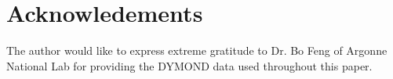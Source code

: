 \section*{Acknowledements}
\label{acknow}
The author would like to express extreme gratitude to Dr. Bo Feng of
Argonne National Lab for providing the DYMOND data used throughout this 
paper.